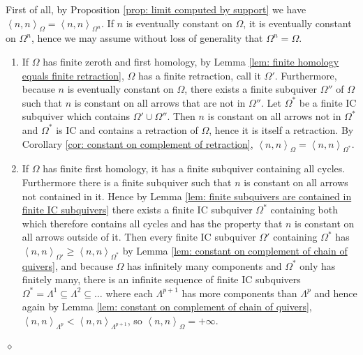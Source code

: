 \documentclass{article}
\newcommand{\bracket}[1]{\left \langle #1 \right\rangle}
\newenvironment{proof}{\vspace*{2ex}\noindent {\em Proof:}
}{\hfill $\diamond$ \\[2ex]}
\begin{document}
\begin{proof}
First of all, by Proposition \ref{prop: limit computed by support} we have $\bracket{n , n}_\Omega = \bracket{n , n}_{\Omega^n}$. If $n$ is eventually constant on $\Omega$, it is eventually constant on $\Omega^n$, hence we may assume without loss of generality that $\Omega^n = \Omega$.
\begin{enumerate}


\item If $\Omega$ has finite zeroth and first homology, by Lemma \ref{lem: finite homology equals finite retraction}, $\Omega$ has a finite retraction, call it $\Omega'$. Furthermore, because $n$ is eventually constant on $\Omega$, there exists a finite subquiver $\Omega''$ of $\Omega$ such that $n$ is constant on all arrows that are not in $\Omega''$. Let $\Omega^*$ be a finite IC subquiver which contains $\Omega' \cup \Omega''$. Then $n$ is constant on all arrows not in $\Omega^*$ and $\Omega^*$ is IC and contains a retraction of $\Omega$, hence it is itself a retraction. By Corollary \ref{cor: constant on complement of retraction}, $\bracket{n , n}_{\Omega} = \bracket{n,n}_{\Omega^*}$. 


\item If $\Omega$ has finite first homology, it has a finite subquiver containing all cycles. Furthermore there is a finite subquiver such that $n$ is constant on all arrows not contained in it. Hence by Lemma \ref{lem: finite subquivers are contained in finite IC subquivers} there exists a finite IC subquiver $\Omega^*$ containing both which therefore contains all cycles and has the property that $n$ is constant on all arrows outside of it. Then every finite IC subquiver $\Omega'$ containing $\Omega^*$ has $\bracket{n , n}_{\Omega'} \geq \bracket{n , n}_{\Omega^*}$ by Lemma \ref{lem: constant on complement of chain of quivers}, and because $\Omega$ has infinitely many components and $\Omega^*$ only has finitely many, there is an infinite sequence of finite IC subquivers $\Omega^* = \Lambda^1 \subseteq \Lambda^2 \subseteq \ldots$ where each $\Lambda^{p + 1}$ has more components than $\Lambda^p$ and hence again by Lemma \ref{lem: constant on complement of chain of quivers}, $\bracket{n , n}_{\Lambda^p} < \bracket{n , n}_{\Lambda^{p + 1}}$, so $\bracket{n , n}_{\Omega} = +\infty$.


    


\end{enumerate}
\end{proof}
\end{document}
